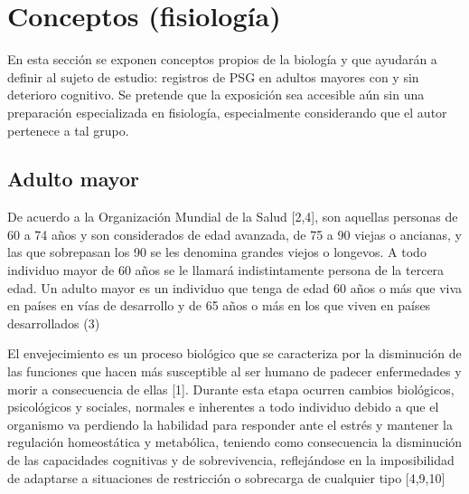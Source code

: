 \chapter{Conceptos (fisiolog\'ia)}

En esta secci\'on se exponen conceptos propios de la biolog\'ia y que ayudar\'an a definir
al sujeto de estudio: registros de PSG en adultos mayores con y sin deterioro cognitivo.
Se pretende que la exposici\'on sea accesible a\'un sin una preparaci\'on 
especializada en fisiolog\'ia, especialmente considerando que el autor pertenece a tal grupo.


\section{Adulto mayor}

De acuerdo a la Organización Mundial de la Salud [2,4], son aquellas personas de 60 a 74 años 
y son considerados de edad avanzada, de 75 a 90 viejas o ancianas, y las que sobrepasan los 90 
se les denomina grandes viejos o longevos. A todo individuo mayor de 60 años se le llamará 
indistintamente persona de la tercera edad. Un adulto mayor es un individuo que tenga de edad 
60 años o más que viva en países en vías de desarrollo y de 65 años o más en los que viven en 
países desarrollados (3) 

El envejecimiento es un proceso biológico que se caracteriza por la disminución de las funciones 
que hacen más susceptible al ser humano de padecer enfermedades y morir a consecuencia de 
ellas [1]. Durante esta etapa ocurren cambios biológicos, psicológicos y sociales, normales e 
inherentes a todo individuo debido a que el organismo va perdiendo la habilidad para responder 
ante el estrés y mantener la regulación homeostática y metabólica, teniendo como consecuencia la 
disminución de las capacidades cognitivas y de sobrevivencia, reflejándose en la imposibilidad de 
adaptarse a situaciones de restricción o sobrecarga de cualquier tipo [4,9,10]

